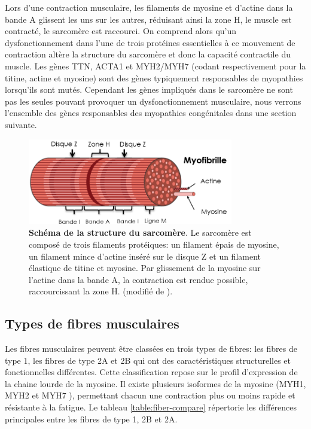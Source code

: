 Lors d'une contraction musculaire, les filaments de myosine et d'actine dans la bande A glissent les uns sur les autres, réduisant ainsi la zone H, le muscle est contracté, le sarcomère est raccourci. On comprend alors qu'un dysfonctionnement dans l'une de trois protéines essentielles à ce mouvement de contraction altère la structure du sarcomère et donc la capacité contractile du muscle. Les gènes TTN, ACTA1 et MYH2/MYH7 (codant respectivement pour la titine, actine et myosine) sont des gènes typiquement responsables de myopathies lorsqu'ils sont mutés. Cependant les gènes impliqués dans le sarcomère ne sont pas les seules pouvant provoquer un dysfonctionnement musculaire, nous verrons l'ensemble des gènes responsables des myopathies congénitales dans une section suivante.
\begin{figure}[!ht]
 \centering
 \includegraphics[width=0.8\textwidth]{figures/sarcomere.png}
 \caption[Schéma de la structure du sarcomère.]{\textbf{Schéma de la structure du sarcomère}. Le sarcomère est composé de trois filaments protéiques: un filament épais de myosine, un filament mince d'actine inséré sur le disque Z et un filament élastique de titine et myosine. Par glissement de la myosine sur l'actine dans la bande A, la contraction est rendue possible, raccourcissant la zone H. (modifié de \cite{burr_basic_2019}).}
 \label{fig:sarcomere}
\end{figure}

\subsection{Types de fibres musculaires}
Les fibres musculaires peuvent être classées en trois types de fibres: les fibres de type 1, les fibres de type 2A et 2B qui ont des caractéristiques structurelles et fonctionnelles différentes. Cette classification repose sur le profil d'expression de la chaine lourde de la myosine. Il existe plusieurs isoformes de la myosine (MYH1, MYH2 et MYH7 \cite{tajsharghi_myosinopathies_2013}), permettant chacun une contraction plus ou moins rapide et résistante à la fatigue. Le tableau \ref{table:fiber-compare} répertorie les différences principales entre les fibres de type 1, 2B et 2A.

